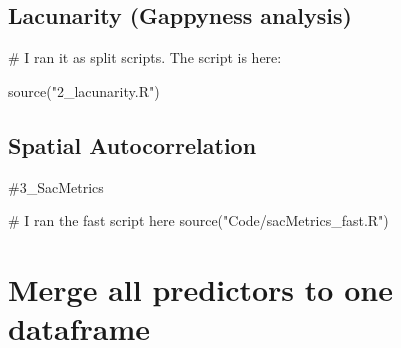 \documentclass[
  letterpaper,
  DIV=11,
  numbers=noendperiod]{scrreprt}
\newenvironment{Shaded}{\begin{snugshade}}{\end{snugshade}}
\newcommand{\CommentTok}[1]{\textcolor[rgb]{0.37,0.37,0.37}{#1}}
\newcommand{\FunctionTok}[1]{\textcolor[rgb]{0.28,0.35,0.67}{#1}}
\newcommand{\NormalTok}[1]{\textcolor[rgb]{0.00,0.23,0.31}{#1}}
\newcommand{\StringTok}[1]{\textcolor[rgb]{0.13,0.47,0.30}{#1}}
\begin{document}
\hypertarget{lacunarity-gappyness-analysis}{%
\subsection{Lacunarity (Gappyness
analysis)}\label{lacunarity-gappyness-analysis}}

\begin{Shaded}
\begin{Highlighting}[]
\CommentTok{\# I ran it as split scripts. The script is here:}

\FunctionTok{source}\NormalTok{(}\StringTok{"2\_lacunarity.R"}\NormalTok{)}
\end{Highlighting}
\end{Shaded}

\hypertarget{spatial-autocorrelation}{%
\subsection{Spatial Autocorrelation}\label{spatial-autocorrelation}}

\begin{Shaded}
\begin{Highlighting}[]
\CommentTok{\#3\_SacMetrics}

\CommentTok{\# I ran the fast script here}
\FunctionTok{source}\NormalTok{(}\StringTok{"Code/sacMetrics\_fast.R"}\NormalTok{)}
\end{Highlighting}
\end{Shaded}

\hypertarget{merge-all-predictors-to-one-dataframe}{%
\section{Merge all predictors to one
dataframe}\label{merge-all-predictors-to-one-dataframe}}
\end{document}
